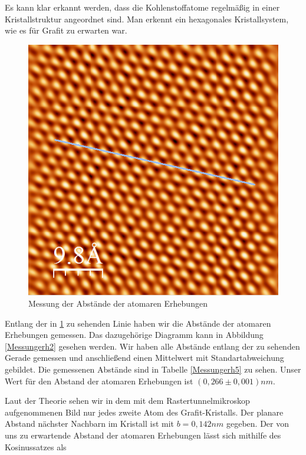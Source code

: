 \documentclass[10pt,a4paper]{article}
\begin{document}
Es kann klar erkannt werden, dass die Kohlenstoffatome regelmäßig in einer Kristallstruktur angeordnet sind. Man erkennt ein hexagonales Kristallsystem, wie es für Grafit zu erwarten war.

\begin{figure}[h]
	\centering

	\includegraphics[scale = 0.6]{Aufnahme_Ebene_doppelte_fourier2.png}

	\caption{Messung der Abstände der atomaren Erhebungen}
	\label{Messungerh1}
\end{figure}

Entlang der in \ref{Messungerh1} zu sehenden Linie haben wir die Abstände der atomaren Erhebungen gemessen. Das dazugehörige Diagramm kann in Abbildung \ref{Messungerh2} gesehen werden. Wir haben alle Abstände entlang der zu sehenden Gerade gemessen und anschließend einen Mittelwert mit Standartabweichung gebildet. Die gemessenen Abstände sind in Tabelle \ref{Messungerh5} zu sehen. Unser Wert für den Abstand der atomaren Erhebungen ist $(0,266 \pm 0,001) nm$.

Laut der Theorie sehen wir in dem mit dem Rastertunnelmikroskop aufgenommenen Bild nur jedes zweite Atom des Grafit-Kristalls. Der planare Abstand nächster Nachbarn im Kristall ist mit $b = 0,142 nm$ gegeben. Der von uns zu erwartende Abstand der atomaren Erhebungen lässt sich mithilfe des Kosinussatzes als 
\end{document}
